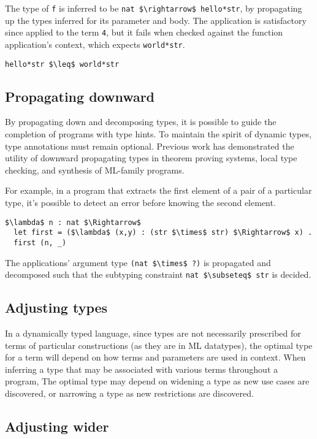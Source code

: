 \documentclass[manuscript]{acmart}
\begin{document}
The type of \lstinline{f} is inferred to be \lstinline{nat $\rightarrow$ hello*str}, 
by propagating up the types inferred for its parameter and body.
The application is satisfactory since applied to the term \lstinline{4}, 
but it fails when checked against the function application's context,
which expects \lstinline{world*str}.
\begin{lstlisting}
hello*str $\leq$ world*str
\end{lstlisting}

\subsection{Propagating downward}
By propagating down and decomposing types, 
it is possible to guide the completion of programs with type hints.
To maintain the spirit of dynamic types, type annotations must remain optional.
Previous work has demonstrated the utility of downward propagating types 
in theorem proving systems, local type checking, 
and synthesis of ML-family programs.

For example, in a program that extracts 
the first element of a pair of a particular type, 
it's possible to detect an error before knowing the second element.

\begin{lstlisting}
$\lambda$ n : nat $\Rightarrow$
  let first = ($\lambda$ (x,y) : (str $\times$ str) $\Rightarrow$ x) .
  first (n, _) 
\end{lstlisting}

\noindent The  applications' argument type \lstinline{(nat $\times$ ?)} 
is propagated and decomposed such that the subtyping constraint 
\lstinline{nat $\subseteq$ str} is decided. 

\subsection{Adjusting types}

In a dynamically typed language, since types are not necessarily prescribed
for terms of particular constructions (as they are in ML datatypes), 
the optimal type for a term will depend on how terms and parameters are used in context. 
When inferring a type that may be associated with various terms throughout a program,  
The optimal type may depend on widening a type as new use cases are discovered,
or narrowing a type as new restrictions are discovered. 

\subsection{Adjusting wider}
\end{document}
